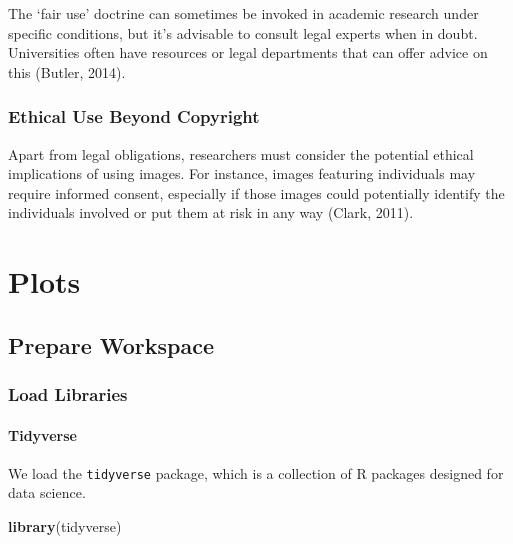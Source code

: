 \documentclass[
  b5paper]{book}
\newenvironment{Shaded}{\begin{snugshade}}{\end{snugshade}}
\newcommand{\FunctionTok}[1]{\textcolor[rgb]{0.13,0.29,0.53}{\textbf{#1}}}
\newcommand{\NormalTok}[1]{#1}
\begin{document}
The `fair use' doctrine can sometimes be invoked in academic research under specific conditions, but it's advisable to consult legal experts when in doubt. Universities often have resources or legal departments that can offer advice on this (Butler, 2014).

\hypertarget{ethical-use-beyond-copyright}{%
\subsubsection*{Ethical Use Beyond Copyright}\label{ethical-use-beyond-copyright}}

Apart from legal obligations, researchers must consider the potential ethical implications of using images. For instance, images featuring individuals may require informed consent, especially if those images could potentially identify the individuals involved or put them at risk in any way (Clark, 2011).

\hypertarget{plots-1}{%
\section{Plots}\label{plots-1}}

\hypertarget{prepare-workspace}{%
\subsection*{Prepare Workspace}\label{prepare-workspace}}

\hypertarget{load-libraries}{%
\subsubsection*{Load Libraries}\label{load-libraries}}

\hypertarget{tidyverse}{%
\paragraph*{Tidyverse}\label{tidyverse}}

We load the \texttt{tidyverse} package, which is a collection of R packages designed for data science.

\begin{Shaded}
\begin{Highlighting}[]
\FunctionTok{library}\NormalTok{(tidyverse)}
\end{Highlighting}
\end{Shaded}
\end{document}
